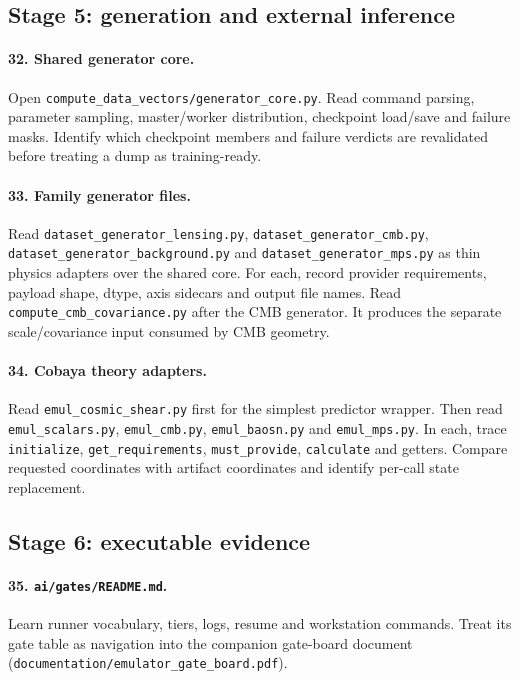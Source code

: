 \documentclass[10pt,aps,prd,twocolumn,nofootinbib]{revtex4-2}
\newcommand{\code}[1]{\texttt{#1}}
\begin{document}
\subsection{Stage 5: generation and external inference}

\paragraph{32.  Shared generator core.}
Open \code{compute\_data\_vectors/generator\_core.py}.  Read command parsing,
parameter sampling, master/worker distribution,
checkpoint load/save and failure masks.  Identify which checkpoint members
and failure verdicts are revalidated before treating a dump as training-ready.

\paragraph{33.  Family generator files.}
Read \code{dataset\_generator\_lensing.py},
\code{dataset\_generator\_cmb.py},
\code{dataset\_generator\_background.py} and
\code{dataset\_generator\_mps.py} as thin physics adapters over the shared
core.  For each, record provider requirements, payload shape, dtype, axis
sidecars and output file names.  Read
\code{compute\_cmb\_covariance.py} after the CMB generator.  It produces the
separate scale/covariance input consumed by CMB geometry.

\paragraph{34.  Cobaya theory adapters.}
Read \code{emul\_cosmic\_shear.py} first for the simplest predictor wrapper.
Then read \code{emul\_scalars.py}, \code{emul\_cmb.py},
\code{emul\_baosn.py} and \code{emul\_mps.py}.  In each, trace
\code{initialize}, \code{get\_requirements}, \code{must\_provide},
\code{calculate} and getters.  Compare requested coordinates with artifact
coordinates and identify per-call state replacement.

\subsection{Stage 6: executable evidence}

\paragraph{35.  \code{ai/gates/README.md}.}
Learn runner vocabulary, tiers, logs, resume and workstation commands.  Treat
its gate table as navigation into the companion gate-board document
(\code{documentation/emulator\_gate\_board.pdf}).
\end{document}
